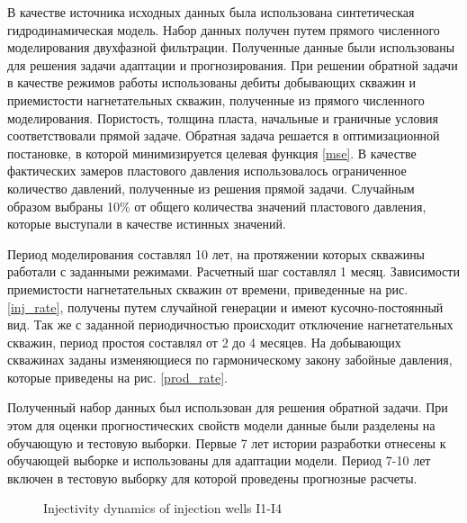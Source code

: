 \documentclass{article}
\begin{document}
В качестве источника исходных данных была использована синтетическая гидродинамическая модель. Набор данных получен путем прямого численного моделирования двухфазной фильтрации. Полученные данные были использованы для решения задачи адаптации и прогнозирования.
При решении обратной задачи в качестве режимов работы использованы дебиты добывающих скважин и приемистости нагнетательных скважин, полученные из прямого численного моделирования. Пористость, толщина пласта, начальные и граничные условия соответствовали прямой задаче. Обратная задача решается в оптимизационной постановке, в которой минимизируется целевая функция {\ref{mse}}. В качестве фактических замеров пластового давления использовалось ограниченное количество давлений, полученные из решения прямой задачи. Случайным образом выбраны 10\% от общего количества значений пластового давления, которые выступали в качестве истинных значений.

Период моделирования составлял 10 лет, на протяжении которых скважины работали с заданными режимами. Расчетный шаг составлял 1 месяц. Зависимости приемистости нагнетательных скважин от времени, приведенные на рис. \ref{inj_rate}, получены путем случайной генерации и имеют кусочно-постоянный вид. Так же с заданной периодичностью происходит отключение нагнетательных скважин, период простоя составлял от 2 до 4 месяцев. На добывающих скважинах заданы изменяющиеся по гармоническому закону забойные давления, которые приведены на рис. \ref{prod_rate}.

Полученный набор данных был использован для решения обратной задачи. При этом для оценки прогностических свойств модели данные были разделены на обучающую и тестовую выборки. Первые 7 лет истории разработки отнесены к обучающей выборке и использованы для адаптации модели. Период 7-10 лет включен в тестовую выборку для которой проведены прогнозные расчеты. 

\begin{figure}
	\caption{Injectivity dynamics of injection wells I1-I4}
	\label{fig:inj_rate}
\end{figure}
\end{document}
